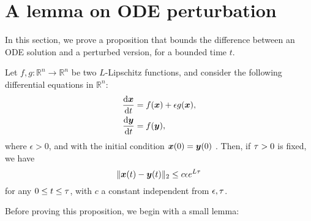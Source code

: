 \section{A lemma on ODE perturbation}

In this section, we prove a proposition that bounds the difference between an ODE solution and a perturbed version, for a bounded time $t$.

\begin{theorem}\label{th:ode_perturbation}
    Let $f, g: \mathbb R^n \to \mathbb R^n$ be two $L$-Lipschitz functions, and consider the following differential equations in $\mathbb R^n$:
    \begin{align*}
       \dv{\bm{x}}{t}  &= f( \bm{x} ) + \epsilon g( \bm{x} ),\\
        \dv{\bm{y}}{t}  &= f( \bm{y} ),
    \end{align*}
    where $\epsilon > 0$, and with the initial condition 
    $ \bm{x} (0) = \bm{y} (0) $ . Then, if $\tau > 0$ is fixed, we have
     \[ \lVert \bm{x} (t) - \bm{y} (t) \rVert_2 \leq c \epsilon e^{L \tau}  \]
    for any $0 \leq t \leq \tau$, with $c$ a constant independent from $\epsilon, \tau$.
\end{theorem}

Before proving this proposition, we begin with a small lemma:

